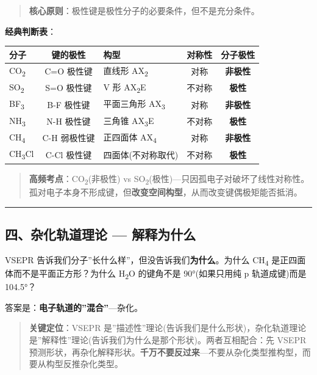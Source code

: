 \begin{quote}
\textbf{核心原则}：极性键是极性分子的必要条件，但不是充分条件。
\end{quote}

\textbf{经典判断表}：

{\def\LTcaptype{none} %
\begin{longtable}[]{@{}lclcc@{}}
\toprule\noalign{}
分子 & 键的极性 & 构型 & 对称性 & 分子极性 \\
\midrule\noalign{}
\endhead
\bottomrule\noalign{}
\endlastfoot
CO\textsubscript{2} & C=O 极性键 & 直线形 AX\textsubscript{2} & 对称 & \textbf{非极性} \\
SO\textsubscript{2} & S=O 极性键 & V 形 AX\textsubscript{2}E & 不对称 & \textbf{极性} \\
BF\textsubscript{3} & B-F 极性键 & 平面三角形 AX\textsubscript{3} & 对称 & \textbf{非极性} \\
NH\textsubscript{3} & N-H 极性键 & 三角锥 AX\textsubscript{3}E & 不对称 & \textbf{极性} \\
CH\textsubscript{4} & C-H 弱极性键 & 正四面体 AX\textsubscript{4} & 对称 & \textbf{非极性} \\
CH\textsubscript{3}Cl & C-Cl 极性键 & 四面体(不对称取代) & 不对称 & \textbf{极性} \\
\end{longtable}
}

\begin{quote}
\textbf{高频考点}：CO\textsubscript{2}(非极性) vs SO\textsubscript{2}(极性)---只因孤电子对破坏了线性对称性。孤对电子本身不形成键，但\textbf{改变空间构型}，从而改变键偶极矩能否抵消。
\end{quote}

\begin{center}\rule{0.5\linewidth}{0.5pt}\end{center}

\subsection{四、杂化轨道理论 --- 解释为什么}\label{ux56dbux6742ux5316ux8f68ux9053ux7406ux8bba-ux89e3ux91caux4e3aux4ec0ux4e48}

VSEPR 告诉我们分子''长什么样''，但没告诉我们\textbf{为什么}。为什么 CH\textsubscript{4} 是正四面体而不是平面正方形？为什么 H\textsubscript{2}O 的键角不是 90°(如果只用纯 p 轨道成键)而是 104.5°？

答案是：\textbf{电子轨道的''混合''}---杂化。

\begin{quote}
\textbf{关键定位}：VSEPR 是''描述性''理论(告诉我们是什么形状)，杂化轨道理论是''解释性''理论(告诉我们为什么是那个形状)。两者互相配合：先 VSEPR 预测形状，再杂化解释形状。\textbf{千万不要反过来}---不要从杂化类型推构型，而要从构型反推杂化类型。
\end{quote}

